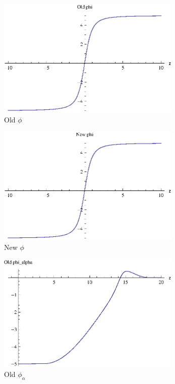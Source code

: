 \documentclass[10pt, conference]{IEEEtran}
\begin{document}
\begin{figure}[!b]
  \begin{center}
    \includegraphics[width=3.45in]{phiOld}
  \end{center}

  \caption{\small Old $\phi$}
  \label{fig:oldPhi}
\end{figure}

\begin{figure}[!b]
  \begin{center}
    \includegraphics[width=3.45in]{phiNew}
  \end{center}

  \caption{\small New $\phi$}
  \label{fig:newPhi}
\end{figure}

\begin{figure}[!b]
  \begin{center}
    \includegraphics[width=3.45in]{phiAlphaOld}
  \end{center}

  \caption{\small Old $\phi_{\alpha}$}
  \label{fig:oldPhiAlpha}
\end{figure}
\end{document}
